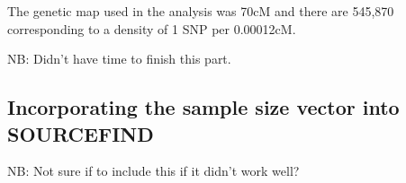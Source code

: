 The genetic map used in the analysis was 70cM and there are 545,870 corresponding to a density of 1 SNP per 0.00012cM. 

NB: Didn't have time to finish this part. 


\subsection{Incorporating the sample size vector into SOURCEFIND}

NB: Not sure if to include this if it didn't work well?








